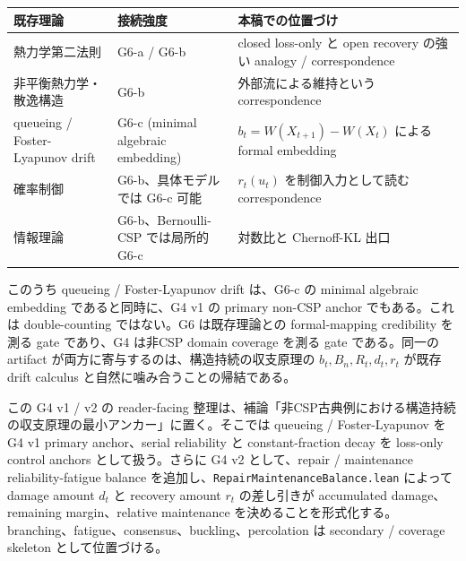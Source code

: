 \documentclass[12pt,a4paper]{article}
\begin{document}
{\def\LTcaptype{table} %
\begin{longtable}[]{@{}
  >{\raggedright\arraybackslash}p{}
  >{\raggedright\arraybackslash}p{}
  >{\raggedright\arraybackslash}p{}@{}}
\toprule\noalign{}
\begin{minipage}[b]{\linewidth}\raggedright
既存理論
\end{minipage} & \begin{minipage}[b]{\linewidth}\raggedright
接続強度
\end{minipage} & \begin{minipage}[b]{\linewidth}\raggedright
本稿での位置づけ
\end{minipage} \\
\midrule\noalign{}
\endhead
\bottomrule\noalign{}
\endlastfoot
熱力学第二法則 & G6-a / G6-b & closed loss-only と open recovery の強い analogy / correspondence \\
非平衡熱力学・散逸構造 & G6-b & 外部流による維持という correspondence \\
queueing / Foster-Lyapunov drift & G6-c (minimal algebraic embedding) & \(b_t=W(X_{t+1})-W(X_t)\) による formal embedding \\
確率制御 & G6-b、具体モデルでは G6-c 可能 & \(r_t(u_t)\) を制御入力として読む correspondence \\
情報理論 & G6-b、Bernoulli-CSP では局所的 G6-c & 対数比と Chernoff-KL 出口 \\
\end{longtable}
}

このうち queueing / Foster-Lyapunov drift は、G6-c の minimal algebraic embedding であると同時に、G4 v1 の primary non-CSP anchor でもある。これは double-counting ではない。G6 は既存理論との formal-mapping credibility を測る gate であり、G4 は非CSP domain coverage を測る gate である。同一の artifact が両方に寄与するのは、構造持続の収支原理の \(b_{t},B_{n},R_{t},d_{t},r_{t}\) が既存 drift calculus と自然に噛み合うことの帰結である。

この G4 v1 / v2 の reader-facing 整理は、補論「非CSP古典例における構造持続の収支原理の最小アンカー」に置く。そこでは queueing / Foster-Lyapunov を G4 v1 primary anchor、serial reliability と constant-fraction decay を loss-only control anchors として扱う。さらに G4 v2 として、repair / maintenance reliability-fatigue balance を追加し、\texttt{RepairMaintenanceBalance.lean} によって damage amount \(d_{t}\) と recovery amount \(r_{t}\) の差し引きが accumulated damage、remaining margin、relative maintenance を決めることを形式化する。branching、fatigue、consensus、buckling、percolation は secondary / coverage skeleton として位置づける。
\end{document}
